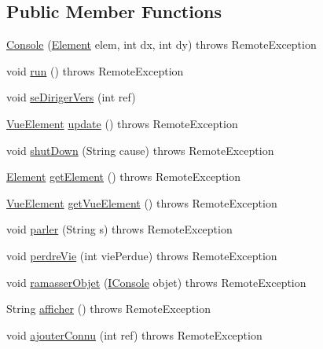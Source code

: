 \subsection*{Public Member Functions}
\begin{DoxyCompactItemize}
\item 
\hyperlink{classcontrole_1_1_console_a35af1c179b641b9afee8647567668b58}{Console} (\hyperlink{classindividu_1_1_element}{Element} elem, int dx, int dy)  throws Remote\-Exception 
\item 
void \hyperlink{classcontrole_1_1_console_a152371882b9665bde857d76438d70d02}{run} ()  throws Remote\-Exception 
\item 
void \hyperlink{classcontrole_1_1_console_aec0965feae069d1376b6ab0996767be8}{se\-Diriger\-Vers} (int ref)
\item 
\hyperlink{classinterface_graphique_1_1_vue_element}{Vue\-Element} \hyperlink{classcontrole_1_1_console_a67a69e366628189229f757915169de2e}{update} ()  throws Remote\-Exception 
\item 
void \hyperlink{classcontrole_1_1_console_a59029e1a06e0276d7ef75ba69bd0c16b}{shut\-Down} (String cause)  throws Remote\-Exception 
\item 
\hyperlink{classindividu_1_1_element}{Element} \hyperlink{classcontrole_1_1_console_abfbaec728b66178c064fd56ded8ece87}{get\-Element} ()  throws Remote\-Exception 
\item 
\hyperlink{classinterface_graphique_1_1_vue_element}{Vue\-Element} \hyperlink{classcontrole_1_1_console_ad1573e5279879abd84a460ffb080fdf3}{get\-Vue\-Element} ()  throws Remote\-Exception 
\item 
void \hyperlink{classcontrole_1_1_console_ad7157537fa92a47ed06563586dba5e2d}{parler} (String s)  throws Remote\-Exception 
\item 
void \hyperlink{classcontrole_1_1_console_a046b6d6c18e8bbecad7a4ff4e2c35a8f}{perdre\-Vie} (int vie\-Perdue)  throws Remote\-Exception 
\item 
void \hyperlink{classcontrole_1_1_console_aaa5374f35b30f5c232aac22041801c38}{ramasser\-Objet} (\hyperlink{interfacecontrole_1_1_i_console}{I\-Console} objet)  throws Remote\-Exception 
\item 
String \hyperlink{classcontrole_1_1_console_a750f2122aee6e608375f999cdfa5f43b}{afficher} ()  throws Remote\-Exception
\item 
void \hyperlink{classcontrole_1_1_console_aae7e697a8bc845c11c1430c08edd6b8c}{ajouter\-Connu} (int ref)  throws Remote\-Exception 
\end{DoxyCompactItemize}


